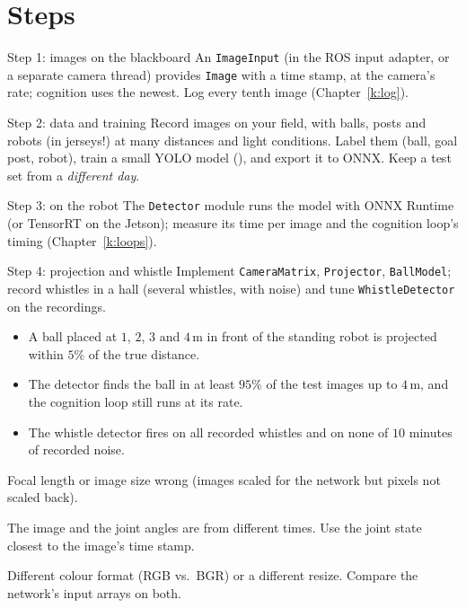 \section*{Steps}
\begin{stepbox}{Step 1: images on the blackboard}
An \texttt{ImageInput} (in the ROS input adapter, or a separate camera thread) provides \texttt{Image} with a time stamp, at the camera's rate; cognition uses the newest. Log every tenth image (Chapter~\ref{k:log}).
\end{stepbox}
\begin{stepbox}{Step 2: data and training}
Record images on your field, with balls, posts and robots (in jerseys!) at many distances and light conditions. Label them (ball, goal post, robot), train a small YOLO model (), and export it to ONNX. Keep a test set from a \emph{different day}.
\end{stepbox}
\begin{stepbox}{Step 3: on the robot}
The \texttt{Detector} module runs the model with ONNX Runtime (or TensorRT on the Jetson\guess); measure its time per image and the cognition loop's timing (Chapter~\ref{k:loops}).
\end{stepbox}
\begin{stepbox}{Step 4: projection and whistle}
Implement \texttt{CameraMatrix}, \texttt{Projector}, \texttt{BallModel}; record whistles in a hall (several whistles, with noise) and tune \texttt{WhistleDetector} on the recordings.
\end{stepbox}

\begin{checkbox}
\begin{itemize}[nosep]
  \item A ball placed at $1$, $2$, $3$ and $4$\,m in front of the standing robot is projected within $5\%$ of the true distance.
  \item The detector finds the ball in at least $95\%$ of the test images up to $4$\,m, and the cognition loop still runs at its rate.
  \item The whistle detector fires on all recorded whistles and on none of $10$ minutes of recorded noise.
\end{itemize}
\end{checkbox}

\begin{troublebox}
\begin{description}[leftmargin=0.6cm,nosep]
  \item[Distances wrong by a constant factor] Focal length or image size wrong (images scaled for the network but pixels not scaled back).
  \item[Distances wrong only while walking] The image and the joint angles are from different times. Use the joint state closest to the image's time stamp.
  \item[Detector good on the laptop, bad on the robot] Different colour format (RGB vs.\ BGR) or a different resize. Compare the network's input arrays on both.
\end{description}
\end{troublebox}

